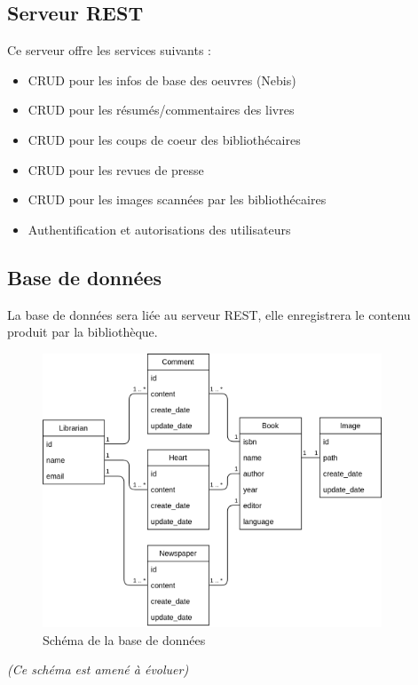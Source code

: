 \documentclass[a4paper, 12pt]{article}
\begin{document}
\subsection{Serveur REST}
Ce serveur offre les services suivants :
\begin{itemize}
	\item CRUD pour les infos de base des oeuvres (Nebis)
	\item CRUD pour les résumés/commentaires des livres
	\item CRUD pour les coups de coeur des bibliothécaires
	\item CRUD pour les revues de presse
	\item CRUD pour les images scannées par les bibliothécaires
	\item Authentification et autorisations des utilisateurs
\end{itemize}

\subsection{Base de données}
La base de données sera liée au serveur REST, elle enregistrera le contenu produit par la bibliothèque.
\begin{figure}
	\begin{center}
		\includegraphics[width=0.9\textwidth]{images/bdd.png}
	\end{center}
	\caption{Schéma de la base de données}
\end{figure}
\textit{(Ce schéma est amené à évoluer)}
\end{document}
